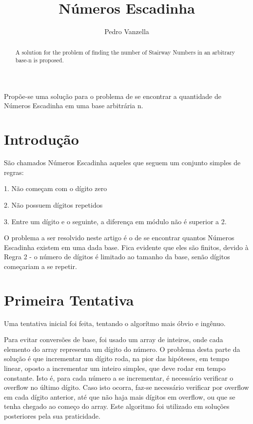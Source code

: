 \documentclass[12pt]{article}
\title{Números Escadinha}
\author{Pedro Vanzella\inst{1}}
\newenvironment{lyxlist}[1]
{\begin{list}{}
{\settowidth{\labelwidth}{#1}
 \setlength{\leftmargin}{\labelwidth}
 \addtolength{\leftmargin}{\labelsep}
 \renewcommand{\makelabel}[1]{##1\hfil}}}
{\end{list}}
\begin{document}
\maketitle
\begin{abstract}
A solution for the problem of finding the number of Stairway Numbers
in an arbitrary base-n is proposed.
\end{abstract}
\begin{resumo}
Propõe-se uma solução para o problema de se encontrar a quantidade de Números Escadinha em uma base arbitrária n.
\end{resumo}


\section{Introdução}\label{section:intro}

São chamados Números Escadinha aqueles que seguem um conjunto simples
de regras:
\begin{lyxlist}{00.00.0000}
\item [{1.}] Não começam com o dígito zero
\item [{2.}] Não possuem dígitos repetidos
\item [{3.}] Entre um dígito e o seguinte, a diferença em módulo não é
superior a 2.
\end{lyxlist}
O problema a ser resolvido neste artigo é o de se encontrar quantos
Números Escadinha existem em uma dada base. Fica evidente que eles
são finitos, devido à Regra 2 - o número de dígitos é limitado ao
tamanho da base, senão dígitos começariam a se repetir.


\section{Primeira Tentativa}\label{section:primeira}

Uma tentativa inicial foi feita, tentando o algorítmo mais óbvio e
ingênuo.

Para evitar conversões de base, foi usado um array de inteiros, onde
cada elemento do array representa um dígito do número. O problema
desta parte da solução é que incrementar um dígito roda, na pior das
hipóteses, em tempo linear, oposto a incrementar um inteiro simples,
que deve rodar em tempo constante. Isto é, para cada número a se incrementar,
é necessário verificar o overflow no último dígito. Caso isto ocorra,
faz-se necessário verificar por overflow em cada dígito anterior,
até que não haja mais dígitos em overflow, ou que se tenha chegado
ao começo do array. Este algoritmo foi utilizado em soluções posteriores
pela sua praticidade. 
\end{document}
